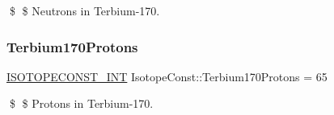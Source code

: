\$ \$ Neutrons in Terbium-\/170. \mbox{\label{group___isotope_const-_terbium-_tb170_gacc3b7eba7259ac7c141a8a41aa20862b}} 
\subsubsection{\texorpdfstring{Terbium170\+Protons}{Terbium170Protons}}
{\footnotesize\ttfamily \mbox{\hyperlink{group___isotope_const-_macros_ga5f18360b3e99483a35c32d789e62621c}{I\+S\+O\+T\+O\+P\+E\+C\+O\+N\+S\+T\+\_\+\+I\+NT}} Isotope\+Const\+::\+Terbium170\+Protons = 65}

\$ \$ Protons in Terbium-\/170. 